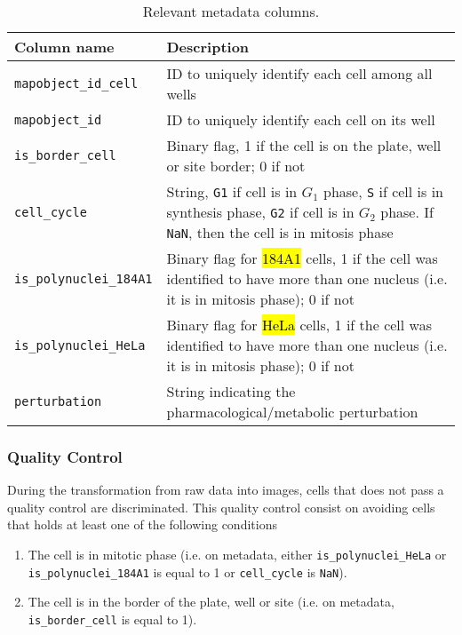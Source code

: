 \setlength{\mylinewidth}{\linewidth-7pt}%
\setlength{\mylengtha}{0.3\mylinewidth-2\arraycolsep}%
\setlength{\mylengthb}{0.7\mylinewidth-2\arraycolsep}%

\begin{table}[!ht]
  \centering
  \begin{tabular}{>{\centering\arraybackslash}m{\mylengtha}|m{\mylengthb}} %
    \hline
    Column name & Description \\
    \hline
    \texttt{mapobject\_id\_cell} & ID to uniquely identify each cell among all wells \\
    \hline
    \texttt{mapobject\_id} & ID to uniquely identify each cell on its well \\
    \hline
    \texttt{is\_border\_cell} & Binary flag, 1 if the cell is on the plate, well or site border; 0 if not \\
    \hline
    \texttt{cell\_cycle} & String, \texttt{G1} if cell is in $G_1$ phase, \texttt{S} if cell is in synthesis phase, \texttt{G2} if cell is in $G_2$ phase. If \texttt{NaN}, then the cell is in mitosis phase \\
    \hline
    \texttt{is\_polynuclei\_184A1} & Binary flag for \hl{184A1} cells, 1 if the cell was identified to have more than one nucleus (i.e. it is in mitosis phase); 0 if not\\
    \hline
    \texttt{is\_polynuclei\_HeLa} & Binary flag for \hl{HeLa} cells, 1 if the cell was identified to have more than one nucleus (i.e. it is in mitosis phase); 0 if not\\
    \hline
    \texttt{perturbation} & String indicating the pharmacological/metabolic perturbation \\
    \hline
  \end{tabular}
  \caption{Relevant metadata columns.}
  \label{table:dataset:metadata}
\end{table}

\subsubsection{Quality Control}

During the transformation from raw data into images, cells that does not pass a quality control are discriminated. This quality control consist on avoiding cells that holds at least one of the following conditions
\begin{enumerate}
  \item The cell is in mitotic phase (i.e. on metadata, either \texttt{is\_polynuclei\_HeLa} or \texttt{is\_polynuclei\_184A1} is equal to 1 or \texttt{cell\_cycle} is \texttt{NaN}).
  \item The cell is in the border of the plate, well or site (i.e. on metadata, \texttt{is\_border\_cell} is equal to 1).
\end{enumerate}

